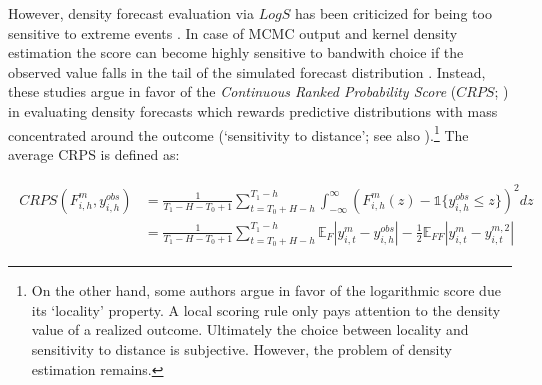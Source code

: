 \documentclass[12pt,letterpaper,fleqn]{article}           %
\begin{document}
However, density forecast evaluation via $LogS$ has been criticized for being too sensitive to extreme events \parencite{gneiting07}. In case of MCMC output and kernel density estimation the score can become highly sensitive to bandwith choice if the observed value falls in the tail of the simulated forecast distribution \parencite{krueger19}.
 Instead, these studies argue in favor of the  \textit{Continuous Ranked Probability Score} ($CRPS$; \cite{matheson76}) in evaluating density forecasts which rewards predictive distributions with mass concentrated around the outcome (`sensitivity to distance'; see also \cite{clark15}).\footnote{On the other hand, some authors argue in favor of the logarithmic score due its `locality' property. A local scoring rule only pays attention to the density value of a realized outcome. Ultimately the choice between locality and sensitivity to distance is subjective. However, the problem of density estimation remains.} 
The average CRPS is defined as:

\begin{align}
\begin{split}
CRPS(F^m_{i,h}, y_{i,h}^{obs}) &= \frac{1}{T_1 - H - T_0 + 1} \sum_{t = T_0 + H - h}^{T_1 - h} \int_{- \infty}^\infty \left(F^m_{i,h}(z) - \mathds{1}\{y_{i,h}^{obs} \leq z\} \right)^2 dz \\
&=  \frac{1}{T_1 - H - T_0 + 1} \sum_{t = T_0 + H - h}^{T_1 - h} \mathds{E}_F | y_{i,t}^m - y_{i,h}^{obs}| - \frac{1}{2} \mathds{E}_{FF} | y_{i,t}^m - y_{i,t}^{m,2}|
\label{eq:crps}
\end{split}
\end{align}
\end{document}
